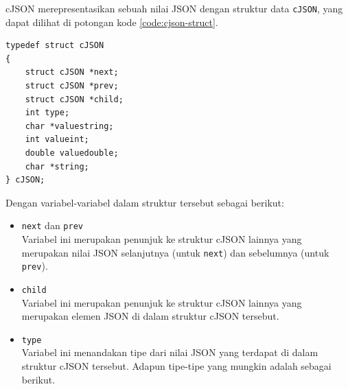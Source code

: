 \documentclass[a4paper,twoside]{article}
\begin{document}
\begin{enumerate}
cJSON merepresentasikan sebuah nilai JSON dengan struktur data \verb|cJSON|, yang dapat dilihat di potongan kode \ref{code:cjson-struct}.

\begin{lstlisting}[caption=Struktur data cJSON, label=code:cjson-struct]
typedef struct cJSON
{
    struct cJSON *next;
    struct cJSON *prev;
    struct cJSON *child;
    int type;
    char *valuestring;
    int valueint;
    double valuedouble;
    char *string;
} cJSON;
\end{lstlisting}
\noindent
Dengan variabel-variabel dalam struktur tersebut sebagai berikut:

\begin{itemize}
	\item \verb|next| dan \verb|prev|\\
	Variabel ini merupakan penunjuk ke struktur cJSON lainnya yang merupakan nilai JSON selanjutnya (untuk \verb|next|) dan sebelumnya (untuk \verb|prev|).
	\item \verb|child|\\
	Variabel ini merupakan penunjuk ke struktur cJSON lainnya yang merupakan elemen JSON di dalam struktur cJSON tersebut.
	\item \verb|type|\\
	Variabel ini menandakan tipe dari nilai JSON yang terdapat di dalam struktur cJSON tersebut. Adapun tipe-tipe yang mungkin adalah sebagai berikut.
	

\end{itemize}
\end{enumerate}
\end{document}
